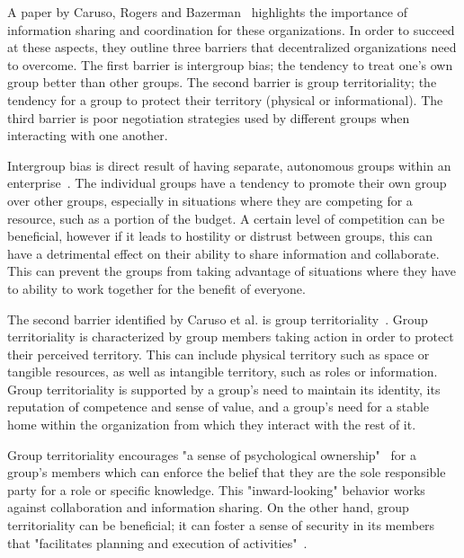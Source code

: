 A paper by Caruso, Rogers and Bazerman~\cite{caruso2008boundaries} highlights the importance of information sharing and coordination for these organizations. In order to succeed at these aspects, they outline three barriers that decentralized organizations need to overcome. The first barrier is intergroup bias; the tendency to treat one's own group better than other groups. The second barrier is group territoriality; the tendency for a group to protect their territory (physical or informational). The third barrier is poor negotiation strategies used by different groups when interacting with one another. 

Intergroup bias is direct result of having separate, autonomous groups within an enterprise~\cite{caruso2008boundaries}. The individual groups have a tendency to promote their own group over other groups, especially in situations where they are competing for a resource, such as a portion of the budget. A certain level of competition can be beneficial, however if it leads to hostility or distrust between groups, this can have a detrimental effect on their ability to share information and collaborate. This can prevent the groups from taking advantage of situations where they have to ability to work together for the benefit of everyone. 

The second barrier identified by Caruso et al. is group territoriality~\cite{caruso2008boundaries}. Group territoriality is characterized by group members taking action in order to protect their perceived territory. This can include physical territory such as space or tangible resources, as well as intangible territory, such as roles or information. Group territoriality is supported by a group's need to maintain its identity, its reputation of competence and sense of value, and a group's need for a stable home within the organization from which they interact with the rest of it.

Group territoriality encourages "a sense of psychological ownership"~\cite{caruso2008boundaries} for a group's members which can enforce the belief that they are the sole responsible party for a role or specific knowledge. This "inward-looking" behavior works against collaboration and information sharing. On the other hand, group territoriality can be beneficial; it can foster a sense of security in its members that "facilitates planning and execution of activities"~\cite{caruso2008boundaries}. 


